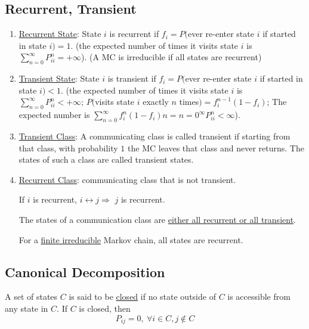 \documentclass[11pt]{elegantbook}
\begin{document}
\subsection{Recurrent, Transient}
\begin{enumerate}[$\bullet$]
    \item \underline{Recurrent State}: State $i$ is recurrent if $f_i=P($ever re-enter state $i$ if started in state $i)=1$. (the expected number of times it visits state $i$ is $\sum_{n=0}^\infty P_{ii}^n=+\infty$). (A MC is irreducible if all states are recurrent)
    \item \underline{Transient State}: State $i$ is transient if $f_i=P($ever re-enter state $i$ if started in state $i)<1$. (the expected number of times it visits state $i$ is $\sum_{n=0}^\infty P_{ii}^n<+\infty$; $P($visits state $i$ exactly $n$ times$)=f_i^{n-1}(1-f_i)$; The expected number is $\sum_{n=0}^\infty f_i^n(1-f_i)n={n=0}^\infty P_{ii}^n<\infty$).
    \item \underline{Transient Class}: A communicating class is called transient if starting from that class, with probability $1$ the MC leaves that class and never returns. The states of such a class are called transient states.
    \item \underline{Recurrent Class}: communicating class that is not transient.
    \begin{lemma}
        If $i$ is recurrent, $i\leftrightarrow j \Rightarrow$ $j$ is recurrent.
    \end{lemma}
    \begin{theorem}
        The states of a communication class are \underline{either all recurrent or all transient}.
    \end{theorem}
    \begin{corollary}
        For a \underline{finite irreducible} Markov chain, all states are recurrent.
    \end{corollary}
\end{enumerate}

\subsection*{Canonical Decomposition}
\begin{definition}
    A set of states $C$ is said to be \underline{closed} if no state outside of $C$ is accessible from any state in $C$. If $C$ is closed, then $$P_{ij} = 0,\ \forall i\in C,j\notin C$$
\end{definition}
\end{document}
